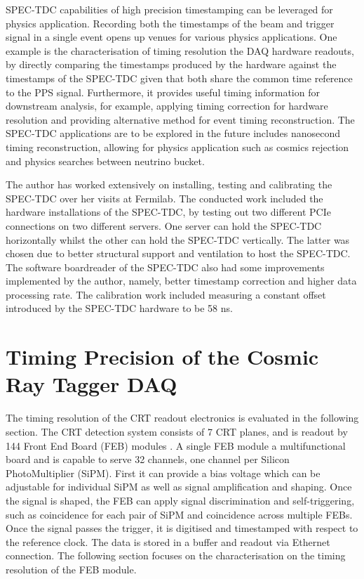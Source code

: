 SPEC-TDC capabilities of high precision timestamping can be leveraged for physics application.
Recording both the timestamps of the beam and trigger signal in a single event opens up venues for various physics applications. 
One example is the characterisation of timing resolution the DAQ hardware readouts, by directly comparing the timestamps produced by the hardware against the timestamps of the SPEC-TDC given that both share the common time reference to the PPS signal.
Furthermore, it provides useful timing information for downstream analysis, for example, applying timing correction for hardware resolution and providing alternative method for event timing reconstruction. 
The SPEC-TDC applications are to be explored in the future includes nanosecond timing reconstruction, allowing for physics application such as cosmics rejection and physics searches between neutrino bucket.

The author has worked extensively on installing, testing and calibrating the SPEC-TDC over her visits at Fermilab.
The  conducted work included the hardware installations of the SPEC-TDC, by testing out two different PCIe connections on two different servers. 
One server can hold the SPEC-TDC horizontally whilst the other can hold the SPEC-TDC vertically. 
The latter was chosen due to better structural support and ventilation to host the SPEC-TDC.
The software boardreader of the SPEC-TDC also had some improvements implemented by the author, namely, better timestamp correction and higher data processing rate.
The calibration work included measuring a constant offset introduced by the SPEC-TDC hardware to be 58 ns.

\section{Timing Precision of the Cosmic Ray Tagger DAQ}
\label{section5.3}

The timing resolution of the CRT readout electronics is evaluated in the following section.
The CRT detection system consists of 7 CRT planes, and is readout by 144 Front End Board (FEB) modules \cite{crt_note}. 
A single FEB module a multifunctional board and is capable to serve 32 channels, one channel per Silicon PhotoMultiplier (SiPM). 
First it can provide a bias voltage which can be adjustable for individual SiPM as well as signal amplification and shaping.
Once the signal is shaped, the FEB can apply signal discrimination and self-triggering, such as coincidence for each pair of SiPM and coincidence across multiple FEBs.
Once the signal passes the trigger, it is digitised and timestamped with respect to the reference clock.
The data is stored in a buffer and readout via Ethernet connection.
The following section focuses on the characterisation on the timing resolution of the FEB module.

